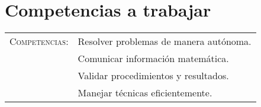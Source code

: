 \documentclass[letterpaper,10pt]{article}
\begin{document}
\vfill

\section{Competencias a trabajar}
\begin{tabular}[t]{R{0.25\textwidth}p{0.71\textwidth}}
    \textsc{Competencias: } &   Resolver problemas de manera aut\'onoma. \\ 
                            &   Comunicar información matem\'atica. \\
                            &   Validar procedimientos y resultados. \\
                            &   Manejar t\'ecnicas eficientemente. \\
\end{tabular}

\end{document}
